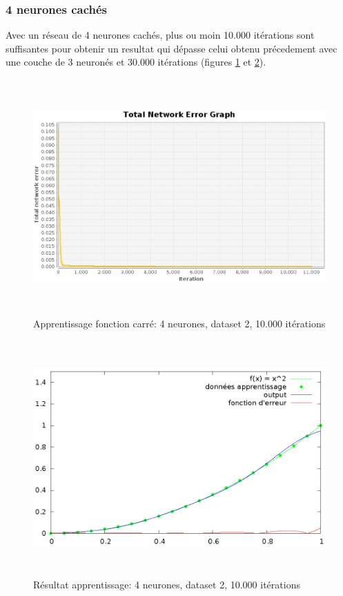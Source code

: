 \documentclass[twoside,openright,a4paper,11pt,french]{article}
\begin{document}
\subsubsection{4 neurones cachés}

Avec un réseau de 4 neurones cachés, plus ou moin 10.000 itérations
sont suffisantes pour obtenir un resultat qui dépasse celui obtenu
précedement avec une couche de 3 neuronés et 30.000 itérations 
(figures \ref{fig:sqtest4} et \ref{fig:chartsqtest4}).


\begin{figure}[ht]
\centering
\includegraphics[width=12cm,height=9cm]{./pics/sqtest4.eps}
\caption{Apprentissage fonction carré: 4 neurones, dataset 2, 10.000 itérations}
\label{fig:sqtest4}
\end{figure}

\begin{figure}[ht]
\centering
\includegraphics[width=12cm,height=9cm]{./pics/chartsqtest4.eps}
\caption{Résultat apprentissage: 4 neurones, dataset 2, 10.000 itérations}
\label{fig:chartsqtest4}
\end{figure}
\end{document}
